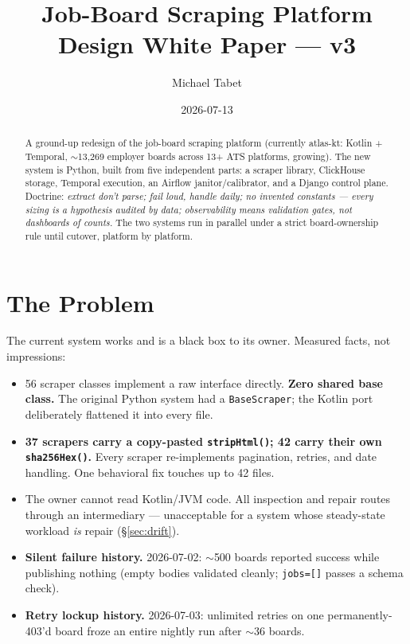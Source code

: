 \documentclass[11pt,a4paper]{article}
\title{\textbf{Job-Board Scraping Platform}\\\large Design White Paper --- v3}
\author{Michael Tabet}
\date{2026-07-13}
\begin{document}
\maketitle

\begin{abstract}
\noindent A ground-up redesign of the job-board scraping platform (currently atlas-kt: Kotlin + Temporal,
$\sim$13{,}269 employer boards across 13+ ATS platforms, growing). The new system is Python, built from five
independent parts: a scraper library, ClickHouse storage, Temporal execution, an Airflow
janitor/calibrator, and a Django control plane. Doctrine: \emph{extract don't parse; fail loud, handle
daily; no invented constants --- every sizing is a hypothesis audited by data; observability means
validation gates, not dashboards of counts.} The two systems run in parallel under a strict board-ownership
rule until cutover, platform by platform.
\end{abstract}

\tableofcontents

\section{The Problem}

The current system works and is a black box to its owner. Measured facts, not impressions:

\begin{itemize}
\item 56 scraper classes implement a raw interface directly. \textbf{Zero shared base class.} The original
Python system had a \texttt{BaseScraper}; the Kotlin port deliberately flattened it into every file.
\item \textbf{37 scrapers carry a copy-pasted \texttt{stripHtml()}; 42 carry their own \texttt{sha256Hex()}.}
Every scraper re-implements pagination, retries, and date handling. One behavioral fix touches up to 42 files.
\item The owner cannot read Kotlin/JVM code. All inspection and repair routes through an intermediary ---
unacceptable for a system whose steady-state workload \emph{is} repair (\S\ref{sec:drift}).
\item \textbf{Silent failure history.} 2026-07-02: $\sim$500 boards reported success while publishing nothing
(empty bodies validated cleanly; \texttt{jobs=[]} passes a schema check).
\item \textbf{Retry lockup history.} 2026-07-03: unlimited retries on one permanently-403'd board froze an
entire nightly run after $\sim$36 boards.
\end{itemize}
\end{document}

